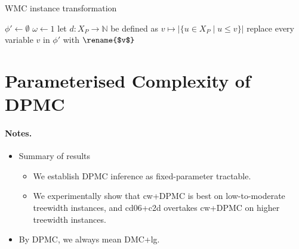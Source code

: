 \documentclass{article}
\theoremstyle{definition}
\theoremstyle{remark}
\begin{document}
\begin{algorithm}
  \caption{WMC instance transformation}
  $\phi' \gets \emptyset$\;
  $\omega \gets 1$\;
  let $d\colon X_P \to \mathbb{N}$ be defined as $v \mapsto |\{ u \in X_P \mid u
  \le v \}|$\;
  replace every variable $v$ in $\phi'$ with $\rename{$v$}$\;
  \;
\end{algorithm}

\section{Parameterised Complexity of DPMC}

\paragraph{Notes.}
\begin{itemize}
\item Summary of results
  \begin{itemize}
  \item We establish DPMC inference as fixed-parameter tractable.
  \item We experimentally show that cw+DPMC is best on low-to-moderate treewidth
    instances, and cd06+c2d overtakes cw+DPMC on higher treewidth instances.
  \end{itemize}
\item By DPMC, we always mean DMC+lg.
\end{itemize}
\end{document}
